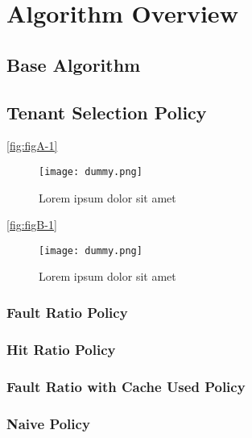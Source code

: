 \chapter{Algorithm Overview}

\section{Base Algorithm}

\lipsum[1-3]

\section{Tenant Selection Policy}

\lipsum[1-1] \ref{fig:figA-1}

\begin{figure}[H]
    \centering
    \texttt{[image: dummy.png]}
    \caption{Lorem ipsum dolor sit amet}
    \label{fig:figA-2}
\end{figure}

\lipsum[1-1] \ref{fig:figB-1}

\begin{figure}[H]
    \centering
    \texttt{[image: dummy.png]}
    \caption{Lorem ipsum dolor sit amet}
    \label{fig:figB-2}
\end{figure}

\subsection{Fault Ratio Policy}

\lipsum[1-1] \cite{reference-1}

\subsection{Hit Ratio Policy}

\lipsum[1-1] \cite{reference-2}

\subsection{Fault Ratio with Cache Used Policy}

\lipsum[1-1] \cite{reference-3}

\subsection{Naive Policy}

